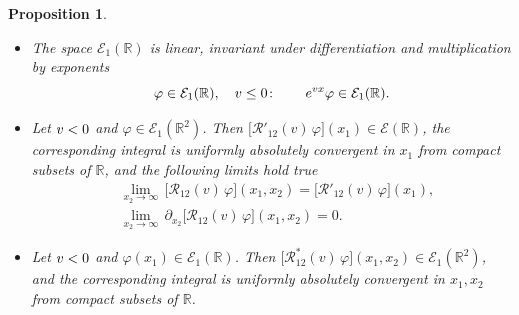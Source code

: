 \documentclass[11pt]{article}
\numberwithin{equation}{section}
\theoremstyle{plain}
\newtheorem{proposition}{Proposition}
\theoremstyle{definition}
\let\Re\relax
\let\Im\relax
\DeclareMathOperator{\Re}{Re}
\DeclareMathOperator{\Im}{Im}
\renewcommand{\phi}{\varphi}
\begin{document}
\begin{proposition} \label{prop:E'space} \- 
	
	\begin{itemize}
		
		\item[(1)] The space $\mathcal{E}_1(\mathbb{R})$ is linear, invariant under differentiation and multiplication by exponents
		\begin{equation}
			\phi \in \mathcal{E}_1(\mathbb{R}), \quad \Re v \leq 0 \colon \qquad e^{v x} \phi \in \mathcal{E}_1(\mathbb{R}).
		\end{equation}
		
		\item[(2)] Let $\Im v < 0$ and $\phi \in \mathcal{E}_1(\mathbb{R}^2)$. Then $\bigl[ \mathcal{R}'_{12}(v) \, \phi \bigr] (x_1) \in \mathcal{E}(\mathbb{R})$, the corresponding integral is uniformly absolutely convergent in $x_1$ from compact subsets of $\mathbb{R}$, and the following limits hold true
		\begin{align}  \label{R-lim}
			& \lim_{x_2 \to \infty} \, \bigl[ \mathcal{R}_{12}(v) \, \phi \bigr] (x_1, x_2) = \bigl[ \mathcal{R}'_{12}(v) \, \phi \bigr] (x_1), \\[6pt]  \label{dR-lim}
			& \lim_{x_2 \to \infty} \, \partial_{x_2}  \bigl[ \mathcal{R}_{12}(v) \, \phi \bigr] (x_1, x_2) = 0.
		\end{align}
		
		\item[(3)] Let $\Im v < 0$ and $\phi(x_1) \in \mathcal{E}_1(\mathbb{R})$. Then $\bigl[ \mathcal{R}^*_{12}(v) \, \phi  \bigr] (x_1, x_2) \in \mathcal{E}_1(\mathbb{R}^2)$, and the corresponding integral is uniformly absolutely convergent in $x_1, x_2$ from compact subsets of $\mathbb{R}$.
		
	\end{itemize}
	
\end{proposition}
\end{document}
